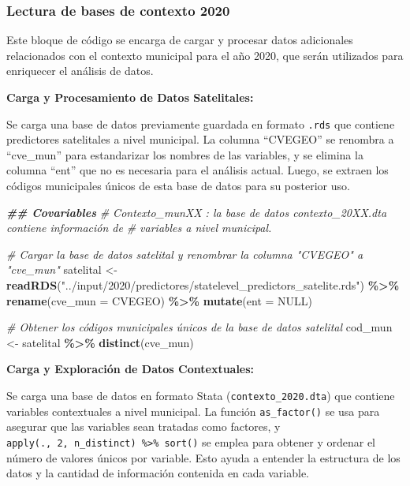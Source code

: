 \documentclass[
  12pt,
]{book}
\newenvironment{Shaded}{\begin{snugshade}}{\end{snugshade}}
\newcommand{\AttributeTok}[1]{\textcolor[rgb]{0.13,0.29,0.53}{#1}}
\newcommand{\CommentTok}[1]{\textcolor[rgb]{0.56,0.35,0.01}{\textit{#1}}}
\newcommand{\ConstantTok}[1]{\textcolor[rgb]{0.56,0.35,0.01}{#1}}
\newcommand{\DocumentationTok}[1]{\textcolor[rgb]{0.56,0.35,0.01}{\textbf{\textit{#1}}}}
\newcommand{\FunctionTok}[1]{\textcolor[rgb]{0.13,0.29,0.53}{\textbf{#1}}}
\newcommand{\NormalTok}[1]{#1}
\newcommand{\OtherTok}[1]{\textcolor[rgb]{0.56,0.35,0.01}{#1}}
\newcommand{\SpecialCharTok}[1]{\textcolor[rgb]{0.81,0.36,0.00}{\textbf{#1}}}
\newcommand{\StringTok}[1]{\textcolor[rgb]{0.31,0.60,0.02}{#1}}
\begin{document}
\hypertarget{lectura-de-bases-de-contexto-2020}{%
\subsubsection*{Lectura de bases de contexto 2020}\label{lectura-de-bases-de-contexto-2020}}

Este bloque de código se encarga de cargar y procesar datos adicionales relacionados con el contexto municipal para el año 2020, que serán utilizados para enriquecer el análisis de datos.

\textbf{Carga y Procesamiento de Datos Satelitales:}

Se carga una base de datos previamente guardada en formato \texttt{.rds} que contiene predictores satelitales a nivel municipal. La columna ``CVEGEO'' se renombra a ``cve\_mun'' para estandarizar los nombres de las variables, y se elimina la columna ``ent'' que no es necesaria para el análisis actual. Luego, se extraen los códigos municipales únicos de esta base de datos para su posterior uso.

\begin{Shaded}
\begin{Highlighting}[]
\DocumentationTok{\#\# Covariables}
\CommentTok{\# Contexto\_munXX : la base de datos contexto\_20XX.dta contiene información de }
\CommentTok{\# variables a nivel municipal. }

\CommentTok{\# Cargar la base de datos satelital y renombrar la columna "CVEGEO" a "cve\_mun"}
\NormalTok{satelital }\OtherTok{\textless{}{-}}
  \FunctionTok{readRDS}\NormalTok{(}\StringTok{"../input/2020/predictores/statelevel\_predictors\_satelite.rds"}\NormalTok{) }\SpecialCharTok{\%\textgreater{}\%}
  \FunctionTok{rename}\NormalTok{(}\AttributeTok{cve\_mun  =}\NormalTok{ CVEGEO) }\SpecialCharTok{\%\textgreater{}\%} \FunctionTok{mutate}\NormalTok{(}\AttributeTok{ent =} \ConstantTok{NULL}\NormalTok{)}

\CommentTok{\# Obtener los códigos municipales únicos de la base de datos satelital}
\NormalTok{cod\_mun }\OtherTok{\textless{}{-}}\NormalTok{ satelital }\SpecialCharTok{\%\textgreater{}\%} \FunctionTok{distinct}\NormalTok{(cve\_mun)}
\end{Highlighting}
\end{Shaded}

\textbf{Carga y Exploración de Datos Contextuales:}

Se carga una base de datos en formato Stata (\texttt{contexto\_2020.dta}) que contiene variables contextuales a nivel municipal. La función \texttt{as\_factor()} se usa para asegurar que las variables sean tratadas como factores, y \texttt{apply(.,\ 2,\ n\_distinct)\ \%\textgreater{}\%\ sort()} se emplea para obtener y ordenar el número de valores únicos por variable. Esto ayuda a entender la estructura de los datos y la cantidad de información contenida en cada variable.
\end{document}
